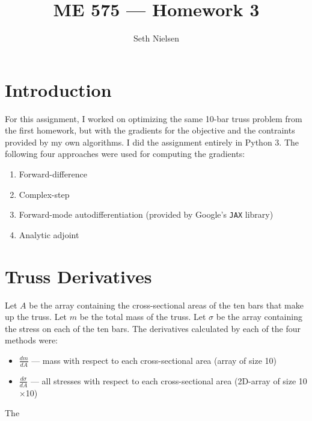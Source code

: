\documentclass{article}
\begin{document}
\title{ME 575 --- Homework 3}
\author{Seth Nielsen}
\date{}
\maketitle

\section*{Introduction}

For this assignment, I worked on optimizing the same 10-bar truss problem from the first homework, but with the gradients for the objective and the contraints provided by my own algorithms. I did the assignment entirely in Python 3. The following four approaches were used for computing the gradients:

\begin{enumerate}
	\item Forward-difference
	\item Complex-step
	\item Forward-mode autodifferentiation (provided by Google's \texttt{JAX} library)
	\item Analytic adjoint
\end{enumerate}

\section{Truss Derivatives}

Let $A$ be the array containing the cross-sectional areas of the ten bars that make up the truss. Let $m$ be the total mass of the truss. Let $\sigma$ be the array containing the stress on each of the ten bars. The derivatives calculated by each of the four methods were:
\begin{itemize}
	\item $ \displaystyle \frac{dm}{dA} $ --- mass with respect to each cross-sectional area (array of size 10)
	\item $ \displaystyle \frac{d\sigma}{dA} $ --- all stresses with respect to each cross-sectional area (2D-array of size 10$\times$10)
\end{itemize}

The 

\begin{figure}[htbp]
	\begin{center}
		\caption{\label{fig:brachcurve}}
	\end{center}
\end{figure}
\end{document}
